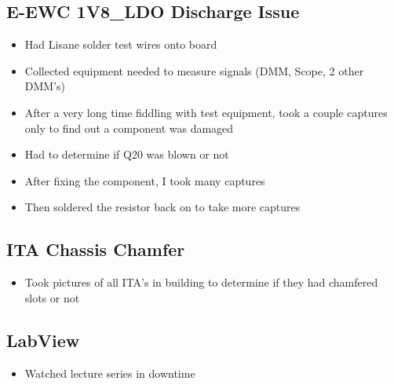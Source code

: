 \documentclass{article}
\begin{document}
\subsection*{E-EWC 1V8\_LDO Discharge Issue}
\begin{itemize}
    \item Had Lisane solder test wires onto board
    \item Collected equipment needed to measure signals (DMM, Scope, 2 other DMM's)
    \item After a very long time fiddling with test equipment, took a couple captures only to find out a component was damaged
    \item Had to determine if Q20 was blown or not
    \item After fixing the component, I took many captures
    \item Then soldered the resistor back on to take more captures
\end{itemize}
\subsection*{ITA Chassis Chamfer}
\begin{itemize}
    \item Took pictures of all ITA's in building to determine if they had chamfered slots or not
\end{itemize}
\subsection*{LabView}
\begin{itemize}
    \item Watched lecture series in downtime
\end{itemize}
\end{document}
